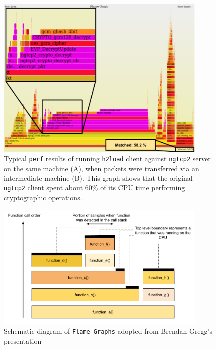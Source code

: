 \documentclass[12pt,a4paper,twoside,openright]{report}
\begin{document}
    \begin{figure}[H]
    \centering
    \includegraphics[width=0.9\textwidth]{figs/zoomed_encrypted_flame_graph_1GByte_h2load.png}
    \caption[Typical \texttt{perf} results of running \texttt{h2load} client against \texttt{ngtcp2} server on the same machine (A), when packets were transferred via an intermediate machine (B)]{Typical \texttt{perf} results of running \texttt{h2load} client against \texttt{ngtcp2} server on the same machine (A), when packets were transferred via an intermediate machine (B). This graph shows that the original \texttt{ngtcp2} client spent about 60\% of its CPU time performing cryptographic operations.} 
    \label{fig:perf_results_of_h2load}
    \end{figure}



    \begin{figure}[H]
    \centering
    \includegraphics[width=0.9\textwidth]{figs/Flame_Graphs_explanation.png}
    \caption[Schematic diagram of \texttt{Flame Graphs}]{Schematic diagram of \texttt{Flame Graphs} adopted from Brendan Gregg's presentation~\cite{USENIX_ATC2017_flamegraphs}}
    \label{fig:Flame_Graphs_explanation}
    \end{figure}
\end{document}
